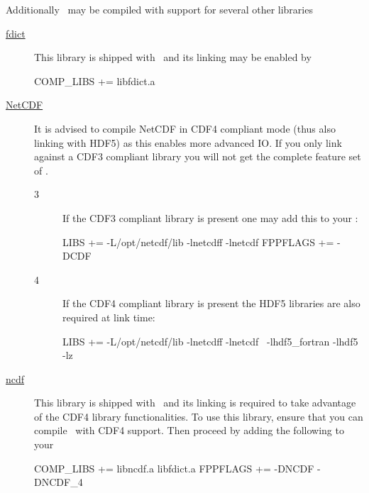 Additionally \siesta\ may be compiled with support for several other
libraries
\begin{description}

  \item[\href{https://github.com/zerothi/fdict}{fdict}] %
  This library is shipped with \siesta\ and its linking may be enabled
  by 
  \begin{shellexample}
    COMP_LIBS += libfdict.a
  \end{shellexample}


  \item[\href{https://www.unidata.ucar.edu/software/netcdf}{NetCDF}] %
  It is advised to compile NetCDF in CDF4 compliant mode (thus
  also linking with HDF5) as this enables more advanced IO. If you
  only link against a CDF3 compliant library you will not get the
  complete feature set of \siesta.

  \begin{description}
    \item[3]%
    If the CDF3 compliant library is present one may add this to
    your :
\begin{shellexample}
  LIBS += -L/opt/netcdf/lib -lnetcdff -lnetcdf
  FPPFLAGS += -DCDF
\end{shellexample}

    \item[4]%
    If the CDF4 compliant library is present the HDF5 libraries
    are also required at link time:
\begin{shellexample}
  LIBS += -L/opt/netcdf/lib -lnetcdff -lnetcdf \
            -lhdf5_fortran -lhdf5 -lz
\end{shellexample}

  \end{description}

  
  \item[\href{https://github.com/zerothi/ncdf}{ncdf}] %
  This library is shipped with \siesta\ and its linking is required to
  take advantage of the CDF4 library functionalities. To use this
  library, ensure that you can compile \siesta\ with CDF4
  support. Then proceed by adding the following to your 
  \begin{shellexample}
    COMP_LIBS += libncdf.a libfdict.a
    FPPFLAGS += -DNCDF -DNCDF_4
  \end{shellexample}


\end{description}
